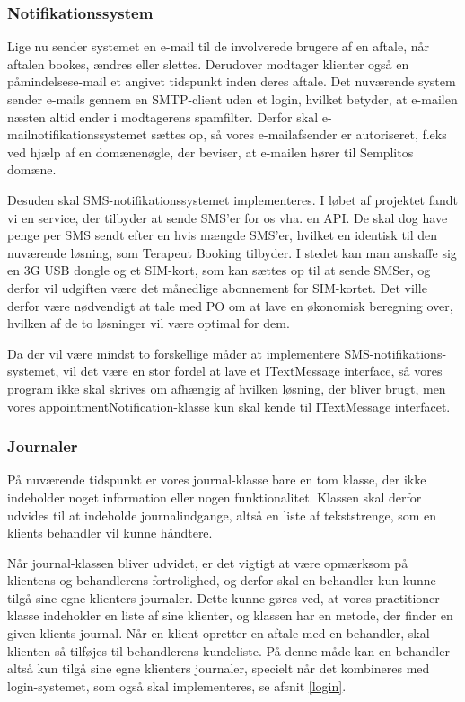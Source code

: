 \subsubsection{Notifikationssystem}

Lige nu sender systemet en e-mail til de involverede brugere af en aftale, når aftalen bookes, ændres eller slettes.
Derudover modtager klienter også en påmindelsese-mail et angivet tidspunkt inden deres aftale.
Det nuværende system sender e-mails gennem en SMTP-client uden et login, hvilket betyder, at e-mailen næsten altid ender i modtagerens spamfilter.
Derfor skal e-mailnotifikationssystemet sættes op, så vores e-mailafsender er autoriseret, f.eks ved hjælp af en domænenøgle, der beviser, at e-mailen hører til Semplitos domæne.

Desuden skal SMS-notifikationssystemet implementeres.
I løbet af projektet fandt vi en service, der tilbyder at sende SMS'er for os vha. en API.
De skal dog have penge per SMS sendt efter en hvis mængde SMS'er, hvilket en identisk til den nuværende løsning, som Terapeut Booking tilbyder.
I stedet kan man anskaffe sig en 3G USB dongle og et SIM-kort, som kan sættes op til at sende SMSer, og derfor vil udgiften være det månedlige abonnement for SIM-kortet.
Det ville derfor være nødvendigt at tale med PO om at lave en økonomisk beregning over, hvilken af de to løsninger vil være optimal for dem.

Da der vil være mindst to forskellige måder at implementere SMS-notifikations-systemet, vil det være en stor fordel at lave et ITextMessage interface, så vores program ikke skal skrives om afhængig af hvilken løsning, der bliver brugt, men vores appointmentNotification-klasse kun skal kende til ITextMessage interfacet.

\subsubsection{Journaler}
På nuværende tidspunkt er vores journal-klasse bare en tom klasse, der ikke indeholder noget information eller nogen funktionalitet.
Klassen skal derfor udvides til at indeholde journalindgange, altså en liste af tekststrenge, som en klients behandler vil kunne håndtere.

Når journal-klassen bliver udvidet, er det vigtigt at være opmærksom på klientens og behandlerens fortrolighed, og derfor skal en behandler kun kunne tilgå sine egne klienters journaler.
Dette kunne gøres ved, at vores practitioner-klasse indeholder en liste af sine klienter, og klassen har en metode, der finder en given klients journal.
Når en klient opretter en aftale med en behandler, skal klienten så tilføjes til behandlerens kundeliste.
På denne måde kan en behandler altså kun tilgå sine egne klienters journaler, specielt når det kombineres med login-systemet, som også skal implementeres, se afsnit \ref{login}.

